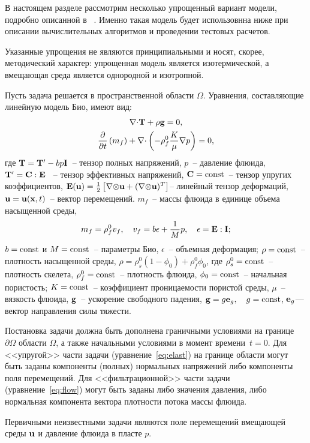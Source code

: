 

В настоящем разделе рассмотрим несколько упрощенный вариант модели, подробно описанной в ~\cite{borisov_2017}. Именно такая модель будет использовнна ниже при
описании вычислительных алгоритмов и проведении тестовых расчетов. 

Указанные упрощения не являются принципиальными и носят, скорее,
методический характер: упрощенная модель является изотермической, 
а вмещающая среда является однородной и изотропной.

Пусть задача решается в пространственной области $\Omega$.
Уравнения, составляющие линейную модель Био, имеют вид:
%
\begin{gather}
\label{eq:elast}
\nabla \dpr\tn{T} +\rho\vc{g} = 0,\\
%
\label{eq:flow}
\dudx{}{t}\left( m_f \right) + \nabla \dpr \left( - \rho_f^0 \frac{K}{\mu}\nabla p\right) = 0,
%
\end{gather}
%
где
%
$\mathbf{T} = \mathbf{T}' - b p \mathbf{I}$~-- тензор полных напряжений, $p$~-- давление флюида,
%
\(
\mathbf{T}' = \mathbf{C}:\mathbf{E}
\)
%
~-- тензор эффективных напряжений, $\mathbf{C}=\operatorname*{{const}}$~-- тензор упругих коэффициентов, 
$\mathbf{E}(\mathbf{u}) = \frac{1}{2} \left[\mathbf{\nabla} \mathbf{\otimes} \mathbf{u} + (\mathbf{\nabla}\mathbf{\otimes} \mathbf{u} )^{T} \right] $-- линейный тензор деформаций, ${\mathbf{u}} = {\mathbf{u}}(\mathbf{x},t)$~-- вектор перемещений.
%
$m_f$~-- массы флюида в единице объема насыщенной среды,
%
\[
m_f = \rho_f^0 v_f, \quad v_f = b\epsilon + \frac{1}{M} p,\quad \epsilon = \mathbf{E}:\mathbf{I};
\]
%
$b=\operatorname*{{const}}$ и $M=\operatorname*{{const}}$~-- параметры Био,
 $\epsilon$~-- объемная деформация;
%
$\rho = \operatorname*{{const}}$~-- плотность насыщенной среды,
%
$\rho = \rho_s^0 (1-\phi_0) + \rho_f^0\phi_0$, где
%
$\rho_s^0=\operatorname*{{const}}$~-- плотность скелета, $\rho_f^0=\operatorname*{{const}}$~-- плотность флюида, $\phi_0=\operatorname*{{const}}$~-- начальная пористость;
%
$K=\operatorname*{{const}}$~-- коэффициент проницаемости пористой среды,
%
$\mu$~-- вязкость флюида,
%
$\mathbf{g}$~-- ускорение свободного падения, 
%
$\mathbf{g} = g\mathbf{e}_g,\quad g = \operatorname*{{const}}$, 
$\mathbf{e}_g$---вектор направления силы тяжести.
%

Постановка задачи должна быть дополнена граничными условиями на границе $\partial\Omega$ области
$\Omega$, а также начальными условиями в момент времени~$t=0$. 
Для <<упругой>> части задачи (уравнение~\eqref{eq:elast}) на границе
области могут быть заданы компоненты (полных) нормальных напряжений
либо компоненты поля перемещений. Для <<фильтрационной>> части задачи
(уравнение~\eqref{eq:flow})
могут быть заданы либо значения давления, либо нормальная компонента
вектора плотности потока массы флюида.

Первичными неизвестными задачи являются поле перемещений вмещающей среды $\mathbf{u}$ и давление
флюида в пласте $p$.


\endinput
